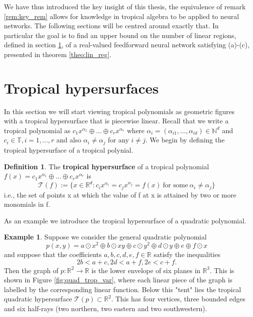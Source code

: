 \documentclass{article}
\theoremstyle{definition}
\newtheorem{definition}[theorem]{Definition}
\newtheorem{example}[theorem]{Example}
\begin{document}
We have thus introduced the key insight of this thesis, the equivalence of remark \ref{rem:key_rem} allows for knowledge in tropical algebra to be applied to neural networks. The following sections will be centred around exactly that. In particular the goal is to find an upper bound on the number of linear regions, defined in section \ref{sec:tropical_hypersurfaces}, of a real-valued feedforward neural network satisfying (a)-(c), presented in theorem \ref{theo:lin_reg}.

\newpage

\section{Tropical hypersurfaces}
\label{sec:tropical_hypersurfaces}

In this section we will start viewing tropical polynomials as geometric figures with a tropical hypersurface that is piecewise linear. Recall that we write a tropical polynomial as $c_1 x^{\alpha_1} \oplus \dots \oplus c_r x^{\alpha_r}$ where $\alpha_i = (\alpha_{i1}, \dots , \alpha_{id}) \in \mathbb{N}^{d}$ and $c_i \in \mathbb{T}, i=1, \dots , r$ and also $\alpha_i \neq \alpha_j$ for any $i \neq j$. We begin by defining the tropical hypersurface of a tropical polynial. 
 
\begin{definition}\hspace{1sp}\cite[p.~3]{zhang2018tropical}
\label{def:trop_hyper}
The \textbf{tropical hypersurface} of a tropical polynomial $f(x) = c_1 x^{\alpha_1} \oplus \dots \oplus c_r x^{\alpha_r}$ is 
$$\mathcal{T}(f) := \{ x \in \mathbb{R}^{d} : c_i x^{\alpha_i} = c_j x^{\alpha_j} = f(x) \ \text{for some} \ \alpha_i \neq \alpha_j \}$$
i.e., the set of points x at which the value of f at x is attained by two or more monomials in f.
\end{definition}
As an example we introduce the tropical hypersurface of a quadratic polynomial.
\begin{example}\hspace{1sp}\cite[p.~23]{maclagan2015introduction}
Suppose we consider the general quadratic polynomial
$$p(x, y) = a \odot x^{2} \oplus b \odot xy \oplus c \odot y^{2} \oplus d \odot y \oplus e \oplus f \odot x$$
and suppose that the coefficients $a,b,c,d,e,f \in \mathbb{R}$ satisfy the inequalities
$$2b < a+c, 2d < a + f, 2e < c + f.$$
Then the graph of $p:\mathbb{R}^{2} \to \mathbb{R}$ is the lower envelope of six planes in $\mathbb{R}^{3}$. This is shown in Figure \ref{fig:quad_trop_var}, where each linear piece of the graph is labelled by the corresponding linear function. Below this "tent" lies the tropical quadratic hypersurface $\mathcal{T}(p) \subset \mathbb{R}^{2}$. This has four vertices, three bounded edges and six half-rays (two northern, two eastern and two southwestern).
\end{example}
\end{document}
